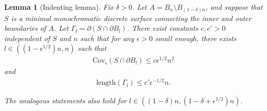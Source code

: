 \documentclass[11pt]{article}
\newtheorem{lemma}[thm]{Lemma}
\theoremstyle{remark}
\theoremstyle{definition}
\begin{document}
\begin{lemma}[Indenting lemma]\label{lem: indenting}
Fix $\delta>0$. Let $A= B_n\setminus B_{(1-\delta)n}$, and suppose that $S$ is a minimal monochromatic discrete surface connecting the inner and outer boundaries of $A$. Let $\Gamma_l=\partial (S\cap \partial B_l)$. There exist constants $c,c'>0$ independent of $S$ and $n$ such that for any $\epsilon>0$ small enough, there exists $l\in ((1-\epsilon^{1/2})n , n)$ such that 
\begin{align*}
    \text{Cov}_{\epsilon}(S \cap \partial B_l) \leq c \epsilon^{1/2} n^2 
\end{align*}
and
\begin{align*}
    \text{length}(\Gamma_l) \leq c' \epsilon^{-1/2} n.
\end{align*}


The analogous statements also hold for $l\in ((1-\delta)n, (1-\delta + \epsilon^{1/2})n)$.
\end{lemma}
\end{document}

